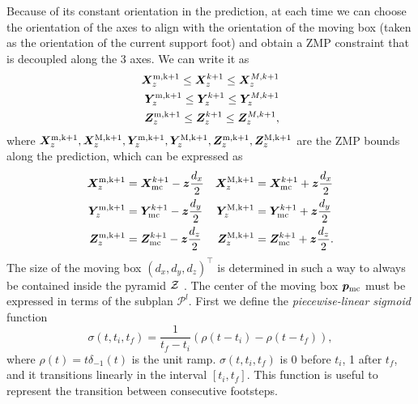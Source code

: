 Because of its constant orientation in the prediction, at each time we can
choose the orientation of the axes to align with the orientation of the moving
box (taken as the orientation of the current support foot) and obtain a ZMP
constraint that is decoupled along the 3 axes. We can write it as
\begin{align}
    \label{eq:ZMP-constraints}
    \begin{split}
        \bm{X}_z^{\rm m,k+1} \le \bm{X}_z^{k+1} \le \bm{X}_z^{M,k+1} \\
        \bm{Y}_z^{\rm m,k+1} \le \bm{Y}_z^{k+1} \le \bm{Y}_z^{M,k+1} \\
        \bm{Z}_z^{\rm m,k+1} \le \bm{Z}_z^{k+1} \le \bm{Z}_z^{M,k+1},
    \end{split}
\end{align}
where $\bm{X}_z^{\rm m,k+1}, \bm{X}_z^{\rm M,k+1}, \bm{Y}_z^{\rm m,k+1},
\bm{Y}_z^{\rm M,k+1}, \bm{Z}_z^{\rm m,k+1}, \bm{Z}_z^{\rm M,k+1}$
are the ZMP bounds along the prediction, which can be expressed as
\begin{equation}
    \begin{aligned}
        \bm{X}_z^{\rm m,k+1} &= \bm{X}_{\rm mc}^{k+1} - {\bm{z}} \frac{d_x}{2} &
        \bm{X}_z^{\rm M,k+1} &= \bm{X}_{\rm mc}^{k+1} + {\bm{z}} \frac{d_x}{2} \\
        \bm{Y}_z^{\rm m,k+1} &= \bm{Y}_{\rm mc}^{k+1} - {\bm{z}} \frac{d_y}{2} &
        \bm{Y}_z^{\rm M,k+1} &= \bm{Y}_{\rm mc}^{k+1} + {\bm{z}} \frac{d_y}{2} \\
        \bm{Z}_z^{\rm m,k+1} &= \bm{Z}_{\rm mc}^{k+1} - {\bm{z}} \frac{d_z}{2} &
        \bm{Z}_z^{\rm M,k+1} &= \bm{Z}_{\rm mc}^{k+1} + {\bm{z}} \frac{d_z}{2}.
    \end{aligned}
\label{eq:FAPA:zmp_constraint_displacement}
\end{equation}
The size of the moving box $(d_x, d_y, d_z)^\top$ is
determined in such a way to always be contained inside the pyramid $\cal Z$
\cite{Zamparelli2018SYROCO, Cipriano2023RAS}.
The center of the moving box ${\bm{p}}_{\rm mc}$ must be expressed in terms of
the subplan $\mathcal{P}^l$. First we define the {\em piecewise-linear sigmoid}
function 
\begin{equation*}
\sigma (t,t_i,t_f)=\frac{1}{t_f-t_i} \left(\rho(t-t_i)-\rho(t-t_f)\right),
\end{equation*}
where $\rho(t)=t\delta_{-1}(t)$ is the unit ramp.
$\sigma (t,t_i,t_f)$ is 0 before $t_i$,  1 after $t_f$, and it transitions
linearly in the interval $[t_i,t_f]$. This function is useful to represent
the transition between consecutive footsteps.


